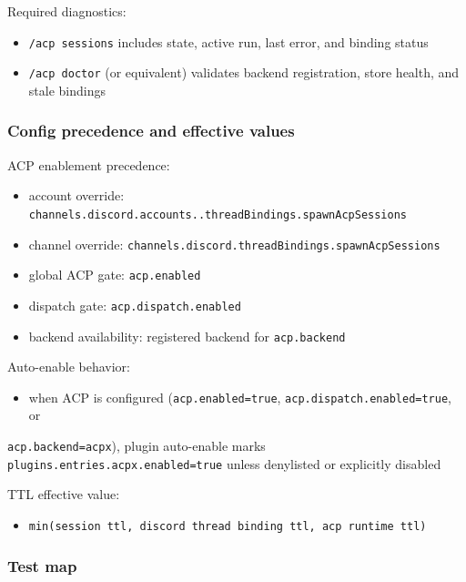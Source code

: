 Required diagnostics:

\begin{itemize}
  \item \texttt{/acp sessions} includes state, active run, last error, and binding status
  \item \texttt{/acp doctor} (or equivalent) validates backend registration, store health, and stale bindings
\end{itemize}


\subsubsection{Config precedence and effective values}


ACP enablement precedence:

\begin{itemize}
  \item account override: \texttt{channels.discord.accounts..threadBindings.spawnAcpSessions}
  \item channel override: \texttt{channels.discord.threadBindings.spawnAcpSessions}
  \item global ACP gate: \texttt{acp.enabled}
  \item dispatch gate: \texttt{acp.dispatch.enabled}
  \item backend availability: registered backend for \texttt{acp.backend}
\end{itemize}


Auto-enable behavior:

\begin{itemize}
  \item when ACP is configured (\texttt{acp.enabled=true}, \texttt{acp.dispatch.enabled=true}, or
\end{itemize}

\texttt{acp.backend=acpx}), plugin auto-enable marks \texttt{plugins.entries.acpx.enabled=true}
unless denylisted or explicitly disabled

TTL effective value:

\begin{itemize}
  \item \texttt{min(session ttl, discord thread binding ttl, acp runtime ttl)}
\end{itemize}


\subsubsection{Test map}


